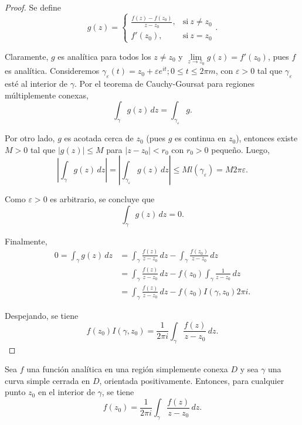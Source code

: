 \begin{proof}
Se define
$$g(z) = \left\{ \begin{array}{cl}
    \frac{f(z) - f(z_0)}{z-z_0}, & \mbox{si} ~ z \neq z_0  \\
    f'(z_0), & \mbox{si} ~ z = z_0
\end{array} \right. .$$

Claramente, $g$ es analítica para todos los $z \neq z_0$ y $\lim\limits_{z \to z_0} g(z) = f'(z_0)$, pues $f$ es analítica. Consideremos $\gamma_{\varepsilon}(t) = z_0 + \varepsilon e^{it}; 0 \leq t \leq 2\pi m$, con $\varepsilon > 0$ tal que $\gamma_{\varepsilon}$ esté al interior de $\gamma$. Por el teorema de Cauchy-Goursat para regiones múltiplemente conexas,
$$\int_{\gamma} g(z) \,dz = \int_{\gamma_{\varepsilon}} g.$$

Por otro lado, $g$ es acotada cerca de $z_0$ (pues $g$ es continua en $z_0$), entonces existe $M > 0$ tal que $|g(z)| \leq M$ para $|z-z_0| < r_0$ con $r_0 > 0$ pequeño. Luego,
$$\left| \int_{\gamma} g(z) \,dz \right| = \left| \int_{\gamma_{\varepsilon}} g(z) \,dz \right| \leq M l(\gamma_{\varepsilon}) = M 2\pi \varepsilon. $$

Como $\varepsilon >0$ es arbitrario, se concluye que
$$\int_{\gamma} g(z) \,dz = 0. $$

Finalmente,
\begin{align*}
    0 = \int_{\gamma} g(z) \,dz &= \int_{\gamma} \frac{f(z)}{z-z_0} \,dz - \int_{\gamma} \frac{f(z_0)}{z-z_0} \,dz \\
    &=  \int_{\gamma} \frac{f(z)}{z-z_0} \,dz - f(z_0) \int_{\gamma} \frac{1}{z-z_0} \,dz \\
    &=  \int_{\gamma} \frac{f(z)}{z-z_0} \,dz - f(z_0) I(\gamma,z_0) 2\pi i.
\end{align*}

Despejando, se tiene
$$f(z_0) I(\gamma,z_0) = \frac{1}{2\pi i} \int_{\gamma} \frac{f(z)}{z-z_0} \,dz.$$
\end{proof}

\begin{corolario}
Sea $f$ una función analítica en una región simplemente conexa $D$ y sea $\gamma$ una curva simple cerrada en $D$, orientada positivamente. Entonces, para cualquier punto $z_0$ en el interior de $\gamma$, se tiene
$$f(z_0) = \frac{1}{2\pi i} \int_{\gamma} \frac{f(z)}{z-z_0} \,dz.$$
\end{corolario}

